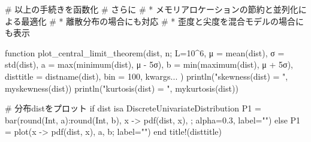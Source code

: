 \documentclass[
  letterpaper,
  DIV=11,
  numbers=noendperiod]{scrartcl}
\newenvironment{Shaded}{\begin{snugshade}}{\end{snugshade}}
\newcommand{\CommentTok}[1]{\textcolor[rgb]{0.37,0.37,0.37}{#1}}
\newcommand{\ControlFlowTok}[1]{\textcolor[rgb]{0.00,0.23,0.31}{#1}}
\newcommand{\DataTypeTok}[1]{\textcolor[rgb]{0.68,0.00,0.00}{#1}}
\newcommand{\FloatTok}[1]{\textcolor[rgb]{0.68,0.00,0.00}{#1}}
\newcommand{\FunctionTok}[1]{\textcolor[rgb]{0.28,0.35,0.67}{#1}}
\newcommand{\KeywordTok}[1]{\textcolor[rgb]{0.00,0.23,0.31}{#1}}
\newcommand{\NormalTok}[1]{\textcolor[rgb]{0.00,0.23,0.31}{#1}}
\newcommand{\OperatorTok}[1]{\textcolor[rgb]{0.37,0.37,0.37}{#1}}
\newcommand{\StringTok}[1]{\textcolor[rgb]{0.13,0.47,0.30}{#1}}
\begin{document}
\begin{Shaded}
\begin{Highlighting}[]
\CommentTok{\# 以上の手続きを函数化}
\CommentTok{\# さらに}
\CommentTok{\#   * メモリアロケーションの節約と並列化による最適化}
\CommentTok{\#   * 離散分布の場合にも対応}
\CommentTok{\#   * 歪度と尖度を混合モデルの場合にも表示}

\KeywordTok{function} \FunctionTok{plot\_central\_limit\_theorem}\NormalTok{(dist, n;}
\NormalTok{        L}\OperatorTok{=}\FloatTok{10}\OperatorTok{\^{}}\FloatTok{6}\NormalTok{,}
\NormalTok{        μ }\OperatorTok{=} \FunctionTok{mean}\NormalTok{(dist),}
\NormalTok{        σ }\OperatorTok{=} \FunctionTok{std}\NormalTok{(dist),}
\NormalTok{        a }\OperatorTok{=} \FunctionTok{max}\NormalTok{(}\FunctionTok{minimum}\NormalTok{(dist), μ }\OperatorTok{{-}} \FloatTok{5}\NormalTok{σ),}
\NormalTok{        b }\OperatorTok{=} \FunctionTok{min}\NormalTok{(}\FunctionTok{maximum}\NormalTok{(dist), μ }\OperatorTok{+} \FloatTok{5}\NormalTok{σ),}
\NormalTok{        disttitle }\OperatorTok{=} \FunctionTok{distname}\NormalTok{(dist),}
\NormalTok{        bin }\OperatorTok{=} \FloatTok{100}\NormalTok{,}
\NormalTok{        kwargs}\OperatorTok{...}
\NormalTok{    )}
    \FunctionTok{println}\NormalTok{(}\StringTok{"skewness(dist) = "}\NormalTok{, }\FunctionTok{myskewness}\NormalTok{(dist))}
    \FunctionTok{println}\NormalTok{(}\StringTok{"kurtosis(dist) = "}\NormalTok{, }\FunctionTok{mykurtosis}\NormalTok{(dist))}
    
    \CommentTok{\# 分布distをプロット}
    \ControlFlowTok{if}\NormalTok{ dist isa DiscreteUnivariateDistribution}
\NormalTok{        P1 }\OperatorTok{=} \FunctionTok{bar}\NormalTok{(}\FunctionTok{round}\NormalTok{(}\DataTypeTok{Int}\NormalTok{, a)}\OperatorTok{:}\FunctionTok{round}\NormalTok{(}\DataTypeTok{Int}\NormalTok{, b), x }\OperatorTok{{-}\textgreater{}} \FunctionTok{pdf}\NormalTok{(dist, x), ; alpha}\OperatorTok{=}\FloatTok{0.3}\NormalTok{, label}\OperatorTok{=}\StringTok{""}\NormalTok{)}
    \ControlFlowTok{else}
\NormalTok{        P1 }\OperatorTok{=} \FunctionTok{plot}\NormalTok{(x }\OperatorTok{{-}\textgreater{}} \FunctionTok{pdf}\NormalTok{(dist, x), a, b; label}\OperatorTok{=}\StringTok{""}\NormalTok{)}
    \ControlFlowTok{end}
    \FunctionTok{title!}\NormalTok{(disttitle)}


\end{Highlighting}
\end{Shaded}
\end{document}
